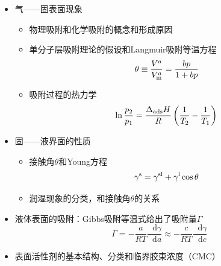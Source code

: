 \documentclass[9pt]{beamer}
\newcommand*{\dif}{\mathop{}\!\mathrm{d}}
\newcommand\m{{\rm m}}
\begin{document}
	\begin{frame}
	
	\begin{itemize}

	\item 气——固表面现象
	
	\begin{itemize}
	
	\item 物理吸附和化学吸附的概念和形成原因
	
	\item 单分子层吸附理论的假设和Langmuir吸附等温方程
	\[
		\theta \equiv \frac{ V^a }{ V^a_\m } = \frac{ bp }{ 1 + bp }
	\]
	
	\item 吸附过程的热力学
	\[
		\ln{ \frac{p_2}{p_1} } = \frac{ \Delta_{\rm ads} H } {R} \left( \frac{1}{T_2} - \frac{1}{T_1} \right) 
	\]
	
	\end{itemize}
	
	\item 固——液界面的性质
	
	\begin{itemize}
	
	\item 接触角$\theta$和Young方程
	\[
		\gamma^{\rm s} = \gamma^{\rm sl} + \gamma^{\rm l} \cos{ \theta }
	\]
	
	\item 润湿现象的分类，和接触角$\theta$的关系
	
	\end{itemize}		
	
	\item 液体表面的吸附：Gibbs吸附等温式给出了吸附量$\varGamma$
	\[
		\varGamma = - \frac{ a }{ RT } \frac{ \dif \gamma }{ \dif a } \approx - \frac{ c }{ RT } \frac{ \dif \gamma }{ \dif c } 
	\]	
	
	\item 表面活性剂的基本结构、分类和临界胶束浓度（CMC）
	
	\end{itemize}		
	
	\end{frame}
	
\end{document}
